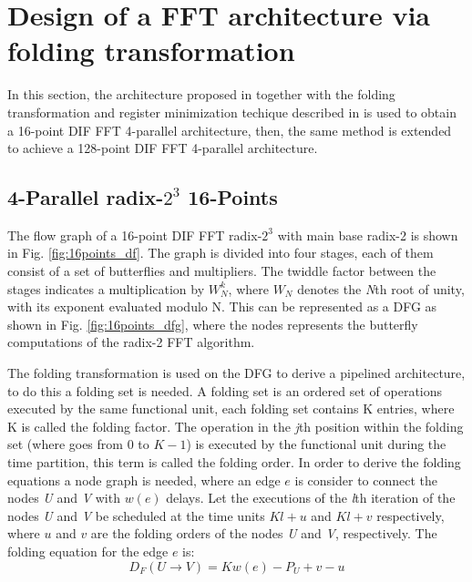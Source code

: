 \documentclass[journal,comsoc]{IEEEtran}
\begin{document}
\section{Design of a FFT architecture via folding transformation} \label{sec:16points}
In this section, the architecture proposed in \cite{ayinala_pipelined_2012} together with the folding transformation and register minimization techique described in \cite{folding_parhi_book} is used to obtain a 16-point DIF FFT 4-parallel architecture, then, the same method is extended  to achieve a 128-point DIF FFT 4-parallel architecture.




\subsection{4-Parallel radix-$2^3$ 16-Points}
The flow graph of a 16-point DIF FFT radix-$2^3$ with main base radix-2 is shown in Fig. \ref{fig:16points_df}. The graph is divided into four stages, each of them consist of a set of butterflies and multipliers. The twiddle factor between the stages indicates a multiplication by $W^k_N$, where $W_N$ denotes the \textit{N}th root of unity, with its exponent evaluated modulo N. This can be represented as a DFG as shown in Fig. \ref{fig:16points_dfg}, where the nodes represents the butterfly computations of the radix-2 FFT algorithm. 

The folding transformation is used on the DFG to derive a pipelined architecture, to do this a folding set is needed. A folding set is an ordered set of operations executed by the same functional unit, each folding set contains K entries, where K is called the folding factor. The operation in the \textit{j}th position within the folding set (where goes from $0$ to $K-1$) is executed by the functional unit during the time partition, this term is called the folding order.
In order to derive the folding equations a node graph is needed, where an edge $e$ is consider to connect the nodes \textit{U} and \textit{V} with $w(e)$ delays. Let the executions of the \textit{l}th iteration of the nodes \textit{U} and \textit{V} be scheduled at the time units $Kl+u$ and $Kl+v$ respectively, where $u$ and $v$ are the folding orders of the nodes \textit{U} and \textit{V}, respectively. The folding equation for the edge $e$ is:
\begin{equation}\label{eqn:fold_equation}
D_F(U \to V) = Kw(e)-P_U+v-u
\end{equation}
\end{document}
